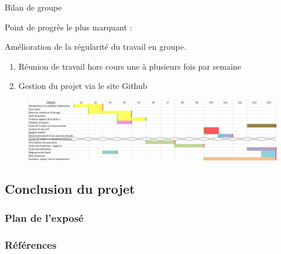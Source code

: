 \documentclass{beamer}
\begin{document}
	\begin{frame}{Bilan de groupe}
	
		{\LARGE Point de progrès le plus marquant :}
		
		Amélioration de la régularité du travail en groupe.
		\begin{enumerate}
		\item Réunion de travail hors cours une à plusieurs fois par semaine
		\item Gestion du projet via le site Github
		\end{enumerate}
		\begin{figure}
			\centering
			\includegraphics[scale=0.17]{media/DiagrammeDeGantt.png}
		\end{figure}
	\end{frame}
	
	\begin{frame}
		\section{Conclusion du projet}
		\frametitle{Plan de l'exposé}
		\tableofcontents[currentsubsection,sectionstyle=show/shaded,subsectionstyle=show/shaded/hide]
	\end{frame}
	
	\begin{frame}
	\end{frame}
	
	\begin{frame}[allowframebreaks]
	\frametitle{Références}
		\tiny
		
		
		\nocite{*}
	\end{frame}
	
\end{document}
